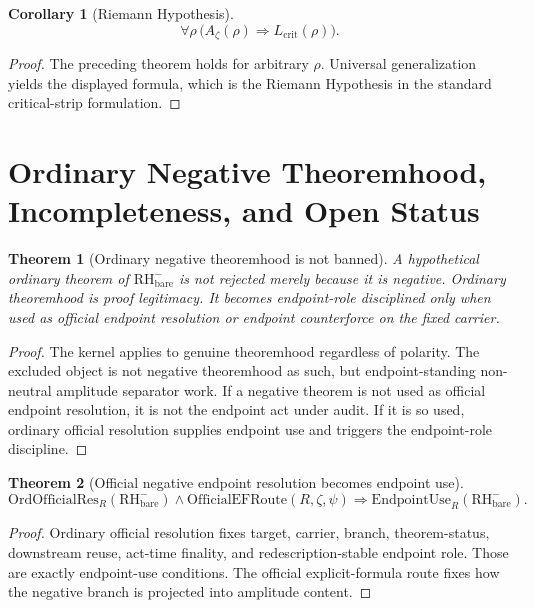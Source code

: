 \documentclass[11pt]{article}
\newtheorem{theorem}{Theorem}[section]
\newtheorem{corollary}{Corollary}[section]
\newcommand{\Az}{A_{\zeta}}
\newcommand{\Lcrit}{L_{\mathrm{crit}}}
\newcommand{\RH}{\mathrm{RH}}
\newcommand{\EndpointUse}{\mathrm{EndpointUse}}
\newcommand{\OfficialEFRoute}{\mathrm{OfficialEFRoute}}
\newcommand{\OrdOfficialRes}{\mathrm{OrdOfficialRes}}
\begin{document}
\begin{corollary}[Riemann Hypothesis]
\[
\forall \rho\,\bigl(\Az(\rho)\Rightarrow \Lcrit(\rho)\bigr).
\]
\end{corollary}

\begin{proof}
The preceding theorem holds for arbitrary \(\rho\).  Universal generalization yields the displayed formula, which is the Riemann Hypothesis in the standard critical-strip formulation.
\end{proof}

\section{Ordinary Negative Theoremhood, Incompleteness, and Open Status}

\begin{theorem}[Ordinary negative theoremhood is not banned]
A hypothetical ordinary theorem of \(\RH^-_{\mathrm{bare}}\) is not rejected merely because it is negative.  Ordinary theoremhood is proof legitimacy.  It becomes endpoint-role disciplined only when used as official endpoint resolution or endpoint counterforce on the fixed carrier.
\end{theorem}

\begin{proof}
The kernel applies to genuine theoremhood regardless of polarity.  The excluded object is not negative theoremhood as such, but endpoint-standing non-neutral amplitude separator work.  If a negative theorem is not used as official endpoint resolution, it is not the endpoint act under audit.  If it is so used, ordinary official resolution supplies endpoint use and triggers the endpoint-role discipline.
\end{proof}

\begin{theorem}[Official negative endpoint resolution becomes endpoint use]
\[
\OrdOfficialRes_R(\RH^-_{\mathrm{bare}})\wedge \OfficialEFRoute(R,\zeta,\psi)
\Rightarrow \EndpointUse_R(\RH^-_{\mathrm{bare}}).
\]
\end{theorem}

\begin{proof}
Ordinary official resolution fixes target, carrier, branch, theorem-status, downstream reuse, act-time finality, and redescription-stable endpoint role.  Those are exactly endpoint-use conditions.  The official explicit-formula route fixes how the negative branch is projected into amplitude content.
\end{proof}
\end{document}
